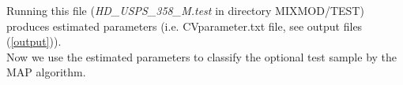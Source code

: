Running this file ({\it HD\_USPS\_358\_M.test} in directory MIXMOD/TEST) produces
estimated parameters (i.e. CVparameter.txt file, see output files (\ref{output})).\\


Now we use the estimated parameters to classify the optional test sample by the
MAP algorithm.







